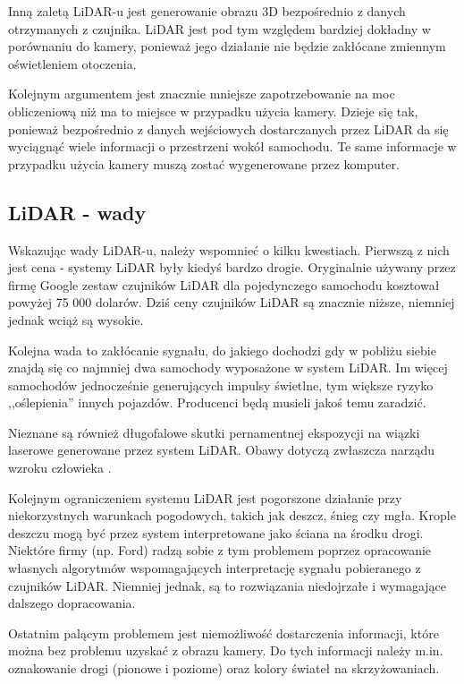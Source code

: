 Inną zaletą LiDAR-u jest generowanie obrazu 3D bezpośrednio z danych otrzymanych z czujnika. LiDAR jest pod tym względem bardziej dokładny w porównaniu do kamery, ponieważ jego działanie nie będzie zakłócane zmiennym oświetleniem otoczenia.

Kolejnym argumentem jest znacznie mniejsze zapotrzebowanie na moc obliczeniową niż ma to miejsce w przypadku użycia kamery. Dzieje się tak, ponieważ bezpośrednio z danych wejściowych dostarczanych przez LiDAR da się wyciągnąć wiele informacji o przestrzeni wokół samochodu. Te same informacje w przypadku użycia kamery muszą zostać wygenerowane przez komputer.

\subsection{LiDAR - wady}
Wskazując wady LiDAR-u, należy wspomnieć o kilku kwestiach. Pierwszą z nich jest cena - systemy LiDAR były kiedyś bardzo drogie. Oryginalnie używany przez firmę Google zestaw czujników LiDAR dla pojedynczego samochodu kosztował powyżej 75 000 dolarów. Dziś ceny czujników LiDAR są znacznie niższe, niemniej jednak wciąż są wysokie.

Kolejna wada to zakłócanie sygnału, do jakiego dochodzi gdy w pobliżu siebie znajdą się co najmniej dwa samochody wyposażone w system LiDAR. Im więcej samochodów jednocześnie generujących impulsy świetlne, tym większe ryzyko ,,oślepienia'' innych pojazdów. Producenci będą musieli jakoś temu zaradzić.

Nieznane są również długofalowe skutki pernamentnej ekspozycji na wiązki laserowe generowane przez system LiDAR. Obawy dotyczą zwłaszcza narządu wzroku człowieka \cite{armenta:lidarSafety}\cite{thomasAko:lidarSafety}\cite{hecht:lidarSafety}.

Kolejnym ograniczeniem systemu LiDAR jest pogorszone działanie przy niekorzystnych warunkach pogodowych, takich jak deszcz, śnieg czy mgła. Krople deszczu mogą być przez system interpretowane jako ściana na środku drogi. Niektóre firmy (np. Ford) radzą sobie z tym problemem poprzez opracowanie własnych algorytmów wspomagających interpretację sygnału pobieranego z czujników LiDAR. Niemniej jednak, są to rozwiązania niedojrzałe i wymagające dalszego dopracowania.

Ostatnim palącym problemem jest niemożliwość dostarczenia informacji, które można bez problemu uzyskać z obrazu kamery. Do tych informacji należy m.in. oznakowanie drogi (pionowe i poziome) oraz kolory świateł na skrzyżowaniach.

